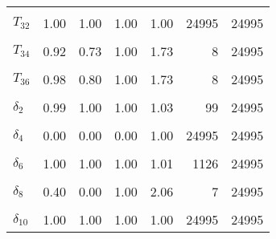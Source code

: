 \begin{table}
\begin{tabular}[t]{lrrrrrr}
\cellcolor{gray!6}{$T_{31}$} & \cellcolor{gray!6}{0.76} & \cellcolor{gray!6}{0.66} & \cellcolor{gray!6}{0.93} & \cellcolor{gray!6}{1.95} & \cellcolor{gray!6}{9} & \cellcolor{gray!6}{8}\\
$T_{32}$ & 1.00 & 1.00 & 1.00 & 1.00 & 24995 & 24995\\
\cellcolor{gray!6}{$T_{33}$} & \cellcolor{gray!6}{1.00} & \cellcolor{gray!6}{1.00} & \cellcolor{gray!6}{1.00} & \cellcolor{gray!6}{1.00} & \cellcolor{gray!6}{24995} & \cellcolor{gray!6}{24995}\\
$T_{34}$ & 0.92 & 0.73 & 1.00 & 1.73 & 8 & 24995\\
\cellcolor{gray!6}{$T_{35}$} & \cellcolor{gray!6}{1.00} & \cellcolor{gray!6}{1.00} & \cellcolor{gray!6}{1.00} & \cellcolor{gray!6}{1.00} & \cellcolor{gray!6}{24995} & \cellcolor{gray!6}{24995}\\
$T_{36}$ & 0.98 & 0.80 & 1.00 & 1.73 & 8 & 24995\\
\cellcolor{gray!6}{$\delta_{1}$} & \cellcolor{gray!6}{0.00} & \cellcolor{gray!6}{0.00} & \cellcolor{gray!6}{0.00} & \cellcolor{gray!6}{1.00} & \cellcolor{gray!6}{24995} & \cellcolor{gray!6}{24995}\\
$\delta_{2}$ & 0.99 & 1.00 & 1.00 & 1.03 & 99 & 24995\\
\cellcolor{gray!6}{$\delta_{3}$} & \cellcolor{gray!6}{0.62} & \cellcolor{gray!6}{0.00} & \cellcolor{gray!6}{1.00} & \cellcolor{gray!6}{1.58} & \cellcolor{gray!6}{9} & \cellcolor{gray!6}{24995}\\
$\delta_{4}$ & 0.00 & 0.00 & 0.00 & 1.00 & 24995 & 24995\\
\cellcolor{gray!6}{$\delta_{5}$} & \cellcolor{gray!6}{0.00} & \cellcolor{gray!6}{0.00} & \cellcolor{gray!6}{0.00} & \cellcolor{gray!6}{1.00} & \cellcolor{gray!6}{24995} & \cellcolor{gray!6}{24995}\\
$\delta_{6}$ & 1.00 & 1.00 & 1.00 & 1.01 & 1126 & 24995\\
\cellcolor{gray!6}{$\delta_{7}$} & \cellcolor{gray!6}{0.60} & \cellcolor{gray!6}{0.00} & \cellcolor{gray!6}{1.00} & \cellcolor{gray!6}{1.54} & \cellcolor{gray!6}{9} & \cellcolor{gray!6}{24995}\\
$\delta_{8}$ & 0.40 & 0.00 & 1.00 & 2.06 & 7 & 24995\\
\cellcolor{gray!6}{$\delta_{9}$} & \cellcolor{gray!6}{0.87} & \cellcolor{gray!6}{0.00} & \cellcolor{gray!6}{1.00} & \cellcolor{gray!6}{2.44} & \cellcolor{gray!6}{6} & \cellcolor{gray!6}{24995}\\
$\delta_{10}$ & 1.00 & 1.00 & 1.00 & 1.00 & 24995 & 24995\\

\end{tabular}
\end{table}
